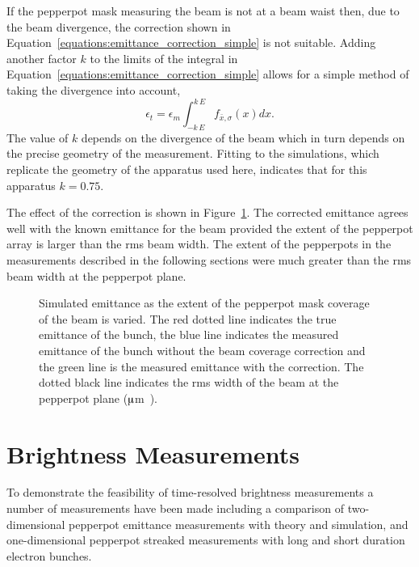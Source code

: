 If the pepperpot mask measuring the beam is not at a beam waist then, due to the beam divergence, the correction shown in Equation~\ref{equations:emittance_correction_simple} is not suitable.
Adding another factor $k$ to the limits of the integral in Equation~\ref{equations:emittance_correction_simple} allows for a simple method of taking the divergence into account,
\begin{equation}
\epsilon_t = \epsilon_m \int_{-k\,E}^{k\,E} f_{\bar{x}, \sigma}(x) dx.
\end{equation}
The value of $k$ depends on the divergence of the beam which in turn depends on the precise geometry of the measurement.
Fitting to the simulations, which replicate the geometry of the apparatus used here, indicates that for this apparatus $k=0.75$.

The effect of the correction is shown in Figure~\ref{figure:pepperpot_extent}.
The corrected emittance agrees well with the known emittance for the beam provided the extent of the pepperpot array is larger than the \gls{rms} beam width.
The extent of the pepperpots in the measurements described in the following sections were much greater than the \gls{rms} beam width at the pepperpot plane.

\begin{figure}
    \center
    
    \caption[Results of a simulation investigating the efficacy of the beam coverage correction for various beam sizes.]{Simulated emittance as the extent of the pepperpot mask coverage of the beam is varied.
    The red dotted line indicates the true emittance of the bunch, the blue line indicates the measured emittance of the bunch without the beam coverage correction and the green line is the measured emittance with the correction.
    The dotted black line indicates the \gls{rms} width of the beam at the pepperpot plane (\unit[873]{$\muup$m}).}
    \label{figure:pepperpot_extent}
\end{figure}

\section{Brightness Measurements}
To demonstrate the feasibility of time-resolved brightness measurements a number of measurements have been made including a comparison of two-dimensional pepperpot emittance measurements with theory and simulation, and one-dimensional pepperpot streaked measurements with long and short duration electron bunches.

